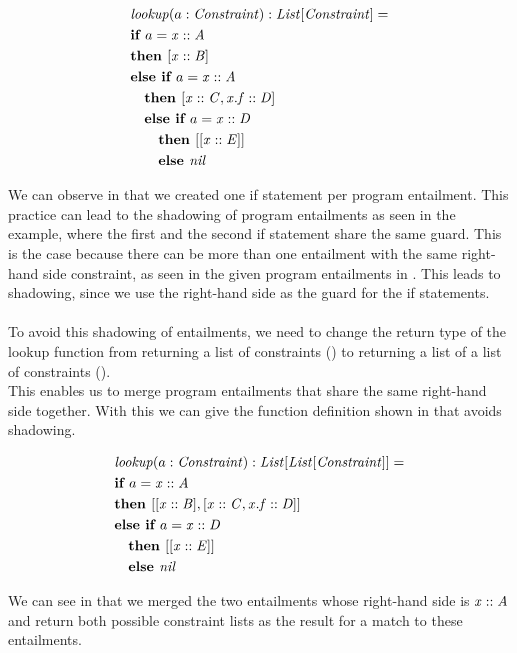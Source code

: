 \begin{example}
\label{ex:lookup-fun-ite}
\begin{align*}
&\mathit{lookup}(a: \mathit{Constraint}): \mathit{List[\mathit{Constraint}]} = \\
&\textbf{if } a = \mathit{x} :: \mathit{A}\\
&\textbf{then } [\mathit{x} :: \mathit{B}]\\
&\textbf{else } \textbf{if } a = \mathit{x} :: \mathit{A}\\
&\quad \textbf{then } [\mathit{x} :: \mathit{C}, \mathit{x.f} :: \mathit{D}]\\
&\quad \textbf{else }\textbf{if } a = \mathit{x} :: \mathit{D}\\
&\qquad \textbf{then } [[\mathit{x} :: \mathit{E}]]\\
&\qquad \textbf{else } \mathit{nil}\\
\end{align*}
\end{example}
%
We can observe in  that we
created one if statement per program entailment.
This practice can lead to the shadowing of program entailments
as seen in the example, where the first and the second if statement share the same guard.
This is the case because there can be more than one entailment
with the same right-hand side constraint,
as seen in the given program entailments in .
This leads to shadowing, since we use the
right-hand side as the guard for the if statements.\\
\\
To avoid this shadowing of entailments,
we need to change the return type of the lookup function
from returning a list of constraints (\Constrs)
to returning a list of a list of constraints (\Constrss).\\
This enables us to merge program entailments that
share the same right-hand side together.
With this we can give the function definition shown in
 that avoids shadowing.
%
\begin{example}
\label{ex:lookup-fun-shadowing}
\begin{align*}
&\mathit{lookup}(a: \mathit{Constraint}): \mathit{List[\mathit{List[\mathit{Constraint}]}]} = \\
&\textbf{if } a = \mathit{x} :: \mathit{A}\\
&\textbf{then } [[\mathit{x} :: \mathit{B}], [\mathit{x} :: \mathit{C}, \mathit{x.f} :: \mathit{D}]]\\
&\textbf{else } \textbf{if } a = \mathit{x} :: \mathit{D}\\
&\quad\textbf{then } [[\mathit{x} :: \mathit{E}]]\\
&\quad\textbf{else } \mathit{nil}\\
\end{align*}
\end{example}
%
We can see in 
that we merged the two entailments whose right-hand side
is $\mathit{x} :: \mathit{A}$ and return both possible constraint lists
as the result for a match to these entailments.


